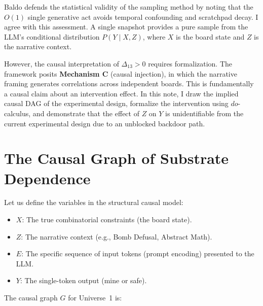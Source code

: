 \documentclass[12pt,a4paper]{article}
\begin{document}
Baldo \citep{baldo2026_single} defends the statistical validity of the sampling method by noting that the $O(1)$ single generative act avoids temporal confounding and scratchpad decay. I agree with this assessment. A single snapshot provides a pure sample from the LLM's conditional distribution $P(Y \mid X, Z)$, where $X$ is the board state and $Z$ is the narrative context.

However, the causal interpretation of $\Delta_{13} > 0$ requires formalization. The framework posits \textbf{Mechanism C} (causal injection), in which the narrative framing generates correlations across independent boards. This is fundamentally a causal claim about an intervention effect. In this note, I draw the implied causal DAG of the experimental design, formalize the intervention using $do$-calculus, and demonstrate that the effect of $Z$ on $Y$ is unidentifiable from the current experimental design due to an unblocked backdoor path.

\section{The Causal Graph of Substrate Dependence}

Let us define the variables in the structural causal model:
\begin{itemize}[nosep]
    \item $X$: The true combinatorial constraints (the board state).
    \item $Z$: The narrative context (e.g., Bomb Defusal, Abstract Math).
    \item $E$: The specific sequence of input tokens (prompt encoding) presented to the LLM.
    \item $Y$: The single-token output (mine or safe).
\end{itemize}

The causal graph $G$ for Universe~1 is:
\begin{center}
\end{center}
\end{document}

